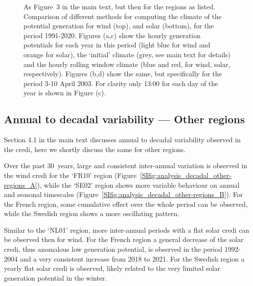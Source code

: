 \documentclass[a4paper,11pt]{extarticle}
\newcommand{\credi}[0]{{\sc credi}}
\newcommand{\sdi}[0]{{\sc solar credi}}
\newcommand{\wdi}[0]{{\sc wind credi}}
\begin{document}
\begin{figure}[hb]
    \caption{
        As Figure~3 in the main text, but then for the regions as listed.
        Comparison of different methods for computing the climate of the potential generation for wind (top), and solar (bottom), for the period 1991-2020. 
        Figures (a,c) show the hourly generation potentials for each year in this period (light blue for wind and orange for solar), the `initial' climate (grey, see main text for details) and the hourly rolling window climate (blue and red, for wind, solar, respectively). 
        Figures (b,d) show the same, but specifically for the period 3-10 April 2003. 
        For clarity only 13:00 for each day of the year is shown in Figure (c).}
    \label{SIfig:climate_other-regions}
\end{figure}

\clearpage
\subsection{Annual to decadal variability --- Other regions}
Section 4.1 in the main text discusses annual to decadal variability observed in the \credi{}, here we shortly discuss the same for other regions. 

Over the past 30~years, large and consistent inter-annual variation is observed in the \wdi{} for the `FR10' region (Figure~\ref{SIfig:analysis_decadal_other-regions_A}), while the `SE02' region shows more variable behaviour on annual and seasonal timescales (Figure~\ref{SIfig:analysis_decadal_other-regions_B}).
For the French region, some cumulative effect over the whole period can be observed, while the Swedish region shows a more oscillating pattern. 

Similar to the `NL01' region, more inter-annual periods with a flat \sdi{} can be observed then for wind. 
For the French region a general decrease of the \sdi, thus anomalous low generation potential, is observed in the period 1992-2004 and a very consistent increase from 2018 to 2021.
For the Swedish region a yearly flat \sdi{} is observed, likely related to the very limited solar generation potential in the winter. 
\end{document}

